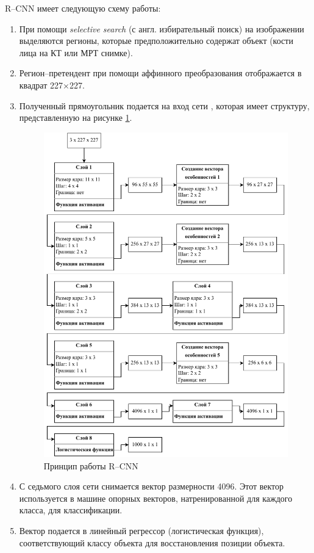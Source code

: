 R--CNN имеет следующую схему работы:
\begin{enumerate}[leftmargin=1.6\parindent]
	\item При помощи \textit{selective search} (с англ. избирательный поиск)  \cite{selsearch} на изображении выделяются регионы, которые предположительно содержат объект (кости лица на КТ или МРТ снимке).
	\item Регион--претендент при помощи аффинного преобразования отображается в квадрат 227$\times$227.
	\item Полученный прямоугольник подается на вход сети \cite{imagenet}, которая имеет структуру, представленную на рисунке \ref{fig:rcnn}.
	 \begin{figure}[H]
	 	\centering
	 	\includegraphics[width=\textwidth]{img/rcnn.pdf}
	 	\caption{Принцип работы R--CNN}
	 	\label{fig:rcnn}
	 \end{figure}
 	\item С седьмого слоя сети снимается вектор размерности 4096. Этот вектор используется в машине опорных векторов, натренированной для каждого класса, для классификации.
 	\item Вектор подается в линейный регрессор (логистическая функция), соответствующий классу объекта для восстановления позиции объекта.
\end{enumerate}


